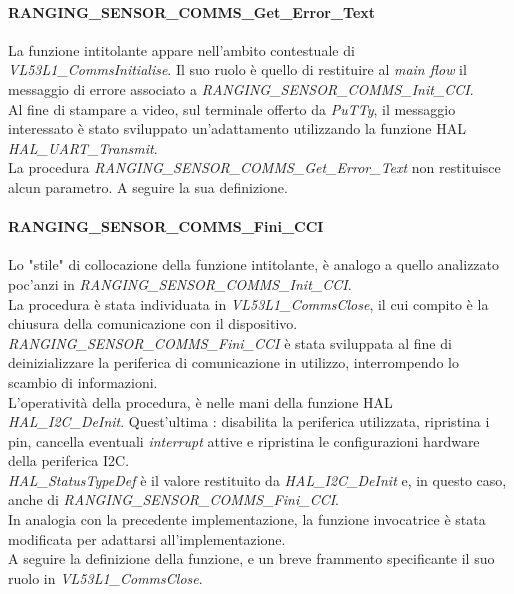 \paragraph{RANGING\_SENSOR\_COMMS\_Get\_Error\_Text}
La funzione intitolante appare nell'ambito contestuale di \textit{VL53L1\_CommsInitialise}. Il suo ruolo è quello di restituire al \textit{main flow} il messaggio di errore associato a \textit{RANGING\_SENSOR\_COMMS\_Init\_CCI}.\\
Al fine di stampare a video, sul terminale offerto da \textit{PuTTy}, il messaggio interessato è stato sviluppato un'adattamento utilizzando la funzione HAL \textit{HAL\_UART\_Transmit}.\\
La procedura \textit{RANGING\_SENSOR\_COMMS\_Get\_Error\_Text} non restituisce alcun parametro.
A seguire la sua definizione.

\paragraph{RANGING\_SENSOR\_COMMS\_Fini\_CCI}
Lo "stile" di collocazione della funzione intitolante, è analogo a quello analizzato poc'anzi in \textit{RANGING\_SENSOR\_COMMS\_Init\_CCI}.\\
La procedura è stata individuata in \textit{VL53L1\_CommsClose}, il cui compito è la chiusura della comunicazione con il dispositivo.\\
\textit{RANGING\_SENSOR\_COMMS\_Fini\_CCI} è stata sviluppata al fine di deinizializzare la periferica di comunicazione in utilizzo, interrompendo lo scambio di informazioni.\\
L'operatività della procedura, è nelle mani della funzione HAL \textit{HAL\_I2C\_DeInit}. Quest'ultima : disabilita la periferica utilizzata, ripristina i pin, cancella eventuali \textit{interrupt} attive e ripristina le configurazioni hardware della periferica I2C.\\
\textit{HAL\_StatusTypeDef} è il valore restituito da \textit{HAL\_I2C\_DeInit} e, in questo caso, anche di \textit{RANGING\_SENSOR\_COMMS\_Fini\_CCI}.\\
In analogia con la precedente implementazione, la funzione invocatrice è stata modificata per adattarsi all'implementazione.\\
A seguire la definizione della funzione, e un breve frammento specificante il suo ruolo in \textit{VL53L1\_CommsClose}.


